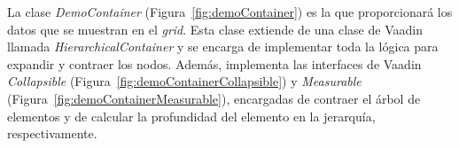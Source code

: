 
La clase \emph{DemoContainer} (Figura~\ref{fig:demoContainer}) es la que proporcionará
los datos que se muestran en el \emph{grid}. Esta clase extiende de una clase de Vaadin llamada \emph{HierarchicalContainer} y se encarga de implementar toda la lógica para expandir y contraer los nodos. Además, implementa las interfaces de Vaadin \emph{Collapsible} (Figura~\ref{fig:demoContainerCollapsible}) y \emph{Measurable} (Figura~\ref{fig:demoContainerMeasurable}), encargadas de contraer el árbol de elementos y de calcular la profundidad del elemento en la jerarquía, respectivamente.


